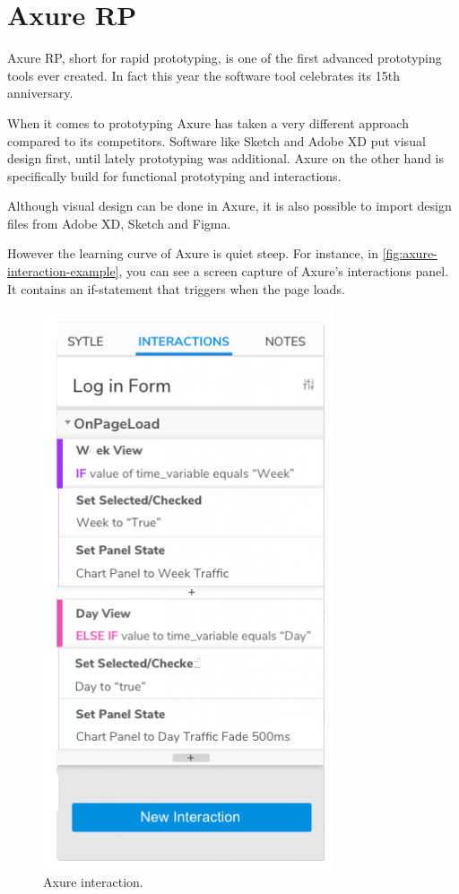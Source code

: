 \section{Axure RP}
Axure RP, short for rapid prototyping, is one of the first advanced prototyping tools ever created. In fact this year the software tool celebrates its 15th anniversary. 

When it comes to prototyping Axure has taken a very different approach compared to its competitors. Software like Sketch and Adobe XD put visual design first, until lately prototyping was additional. Axure on the other hand is specifically build for functional prototyping and interactions.

Although visual design can be done in Axure, it is also possible to import design files from Adobe XD, Sketch and Figma.

However the learning curve of Axure is quiet steep. For instance, in \autoref{fig:axure-interaction-example}, you can see a screen capture of Axure's interactions panel. It contains an if-statement that triggers when the page loads. 
\begin{figure}[H]
\centering
\includegraphics[scale=.5]{figures/axure-rp/interaction-example.png}
\caption{Axure interaction.}
\label{fig:axure-interaction-example}
\end{figure}

